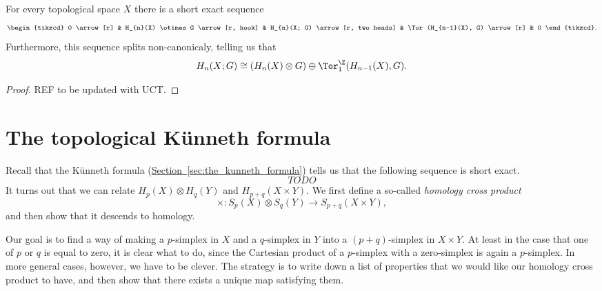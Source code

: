 \documentclass[main.tex]{subfiles}
\begin{document}
\begin{theorem}
  \label{thm:topological_universal_coefficient_theorem}
  For every topological space $X$ there is a short exact sequence
  \begin{equation*}
    \begin{tikzcd}
      0
      \arrow[r]
      & H_{n}(X) \otimes G
      \arrow[r, hook]
      & H_{n}(X; G)
      \arrow[r, two heads]
      & \Tor(H_{n-1}(X), G)
      \arrow[r]
      & 0
    \end{tikzcd}.
  \end{equation*}
  Furthermore, this sequence splits non-canonicaly, telling us that
  \begin{equation*}
    H_{n}(X; G) \cong (H_{n}(X) \otimes G) \oplus \Tor^{\Z}_{1}(H_{n-1}(X), G).
  \end{equation*}
\end{theorem}
\begin{proof}
  REF to be updated with UCT.
\end{proof}

\section{The topological Künneth formula}
\label{sec:the_topological_kunneth_formula}

Recall that the Künneth formula (\hyperref[sec:the_kunneth_formula]{Section~\ref*{sec:the_kunneth_formula}}) tells us that the following sequence is short exact.
\begin{equation*}
  TODO
\end{equation*}
It turns out that we can relate $H_{p}(X) \otimes H_{q}(Y)$ and $H_{p+q}(X \times Y)$. We first define a so-called \emph{homology cross product}
\begin{equation*}
  \times\colon S_{p}(X) \otimes S_{q}(Y) \to S_{p+q}(X \times Y),
\end{equation*}
and then show that it descends to homology.

Our goal is to find a way of making a $p$-simplex in $X$ and a $q$-simplex in $Y$ into a $(p+q)$-simplex in $X \times Y$. At least in the case that one of $p$ or $q$ is equal to zero, it is clear what to do, since the Cartesian product of a $p$-simplex with a zero-simplex is again a $p$-simplex. In more general cases, however, we have to be clever. The strategy is to write down a list of properties that we would like our homology cross product to have, and then show that there exists a unique map satisfying them.
\end{document}
